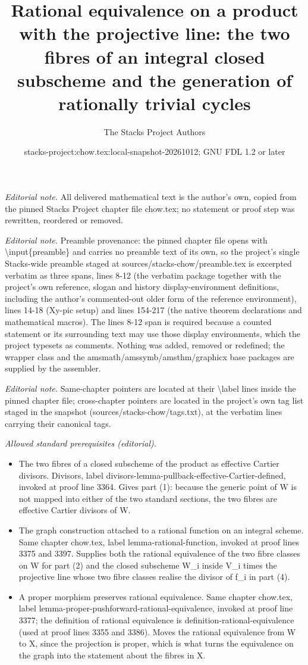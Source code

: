 \documentclass[10pt,a4paper]{amsart}
\title{Rational equivalence on a product with the projective line: the two fibres of an integral closed subscheme and the generation of rationally trivial cycles}
\author{The Stacks Project Authors}
\date{stacks-project:chow.tex:local-snapshot-20261012; GNU FDL 1.2 or later}
\theoremstyle{plain}
\theoremstyle{definition}
\theoremstyle{remark}
\numberwithin{equation}{subsection}
\begin{document}
\maketitle
\noindent\textit{Editorial note.} All delivered mathematical text is the author's own, copied from the pinned Stacks Project chapter file chow.tex; no statement or proof step was rewritten, reordered or removed.\par\medskip
\noindent\textit{Editorial note.} Preamble provenance: the pinned chapter file opens with \textbackslash{}input\{preamble\} and carries no preamble text of its own, so the project's single Stacks-wide preamble staged at sources/stacks-chow/preamble.tex is excerpted verbatim as three spans, lines 8-12 (the verbatim package together with the project's own reference, slogan and history display-environment definitions, including the author's commented-out older form of the reference environment), lines 14-18 (Xy-pic setup) and lines 154-217 (the native theorem declarations and mathematical macros). The lines 8-12 span is required because a counted statement or its surrounding text may use those display environments, which the project typesets as comments. Nothing was added, removed or redefined; the wrapper class and the amsmath/amssymb/amsthm/graphicx base packages are supplied by the assembler.\par\medskip
\noindent\textit{Editorial note.} Same-chapter pointers are located at their \textbackslash{}label lines inside the pinned chapter file; cross-chapter pointers are located in the project's own tag list staged in the snapshot (sources/stacks-chow/tags.txt), at the verbatim lines carrying their canonical tags.\par\medskip
\noindent\textit{Allowed standard prerequisites (editorial).}\begin{itemize}
\item The two fibres of a closed subscheme of the product as effective Cartier divisors. Divisors, label divisors-lemma-pullback-effective-Cartier-defined, invoked at proof line 3364. Gives part (1): because the generic point of W is not mapped into either of the two standard sections, the two fibres are effective Cartier divisors of W.
\item The graph construction attached to a rational function on an integral scheme. Same chapter chow.tex, label lemma-rational-function, invoked at proof lines 3375 and 3397. Supplies both the rational equivalence of the two fibre classes on W for part (2) and the closed subscheme W\_i inside V\_i times the projective line whose two fibre classes realise the divisor of f\_i in part (4).
\item A proper morphism preserves rational equivalence. Same chapter chow.tex, label lemma-proper-pushforward-rational-equivalence, invoked at proof line 3377; the definition of rational equivalence is definition-rational-equivalence (used at proof lines 3355 and 3386). Moves the rational equivalence from W to X, since the projection is proper, which is what turns the equivalence on the graph into the statement about the fibres in X.
\end{itemize}\medskip
\end{document}
